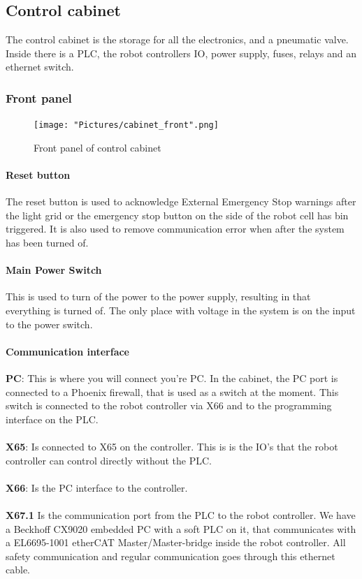 \documentclass{article}
\begin{document}
        
\newpage

    \subsection{Control cabinet}
    The control cabinet is the storage for all the electronics, and a pneumatic valve. Inside there is a PLC, the robot controllers IO, power supply, fuses, relays and an ethernet switch.
        \subsubsection{Front panel}
        \begin{figure}[!h]
            \centering
            \texttt{[image: "Pictures/cabinet\_front".png]}
            \caption{Front panel of control cabinet}
        \end{figure}
        
        \paragraph{Reset button}
        The reset button is used to acknowledge External Emergency Stop warnings after the light grid or the emergency stop button on the side of the robot cell has bin triggered. It is also used to remove communication error when after the system has been turned of. 
        
        \paragraph{Main Power Switch}
        This is used to turn of the power to the power supply, resulting in that everything is turned of. The only place with voltage in the system is on the input to the power switch.
        
        \paragraph{Communication interface}
        \textbf{PC}: This is where you will connect you're PC. In the cabinet, the PC port is connected to a Phoenix firewall, that is used as a switch at the moment. This switch is connected to the robot controller via X66 and to the programming interface on the PLC.
        \\\\
        \textbf{X65}: Is connected to X65 on the controller. This is is the IO's that the robot controller can control directly without the PLC.
        \\\\
        \textbf{X66}: Is the PC interface to the controller.
        \\\\
        \textbf{X67.1} Is the communication port from the PLC to the robot controller. We have a Beckhoff CX9020 embedded PC with a soft PLC on it, that communicates with a EL6695-1001 etherCAT Master/Master-bridge inside the robot controller. All safety communication and regular communication goes through this ethernet cable.  
        
\end{document}
